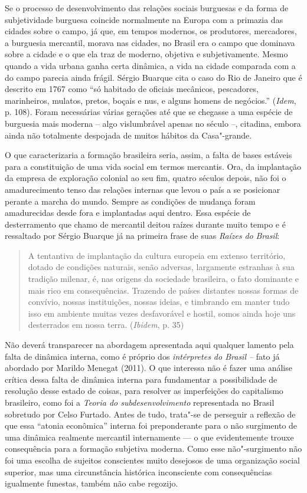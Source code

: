 {Se o processo de desenvolvimento das relações sociais burguesas e da
forma de subjetividade burguesa coincide normalmente na Europa com a
primazia das cidades sobre o campo, já que, em tempos modernos, os
produtores, mercadores, a burguesia mercantil, morava nas cidades, no
Brasil era o campo que dominava sobre a cidade e o que ela traz de
moderno, objetiva e subjetivamente. Mesmo quando a vida urbana ganha
certa dinâmica, a vida na cidade comparada com a do campo parecia ainda
frágil. Sérgio Buarque cita o caso do Rio de Janeiro que é descrito em
1767 como ``só habitado de oficiais mecânicos, pescadores, marinheiros,
mulatos, pretos, boçais e nus, e alguns homens de negócios.'' (\emph{Idem}, p. 108). Foram
necessárias várias gerações até que se chegasse a uma espécie de
burguesia mais moderna -- algo vislumbrável apenas no século  --,
citadina, embora ainda não totalmente despojada de muitos hábitos da
Casa"-grande.

O que caracterizaria a formação brasileira seria, assim, a falta de
bases estáveis para a constituição de uma vida social em termos
mercantis. Ora, da implantação da empresa de exploração colonial ao seu
fim, quatro séculos depois, não foi o amadurecimento tenso das relações
internas que levou o país a se posicionar perante a marcha do mundo.
Sempre as condições de mudança foram amadurecidas desde fora e
implantadas aqui dentro. Essa espécie de desterramento que chamo de mercantil deitou
raízes durante muito tempo e é ressaltado por Sérgio Buarque já na
primeira frase de suas \emph{Raízes} \emph{do} \emph{Brasil}:

\begin{quote}
A tentantiva de implantação da cultura europeia em extenso território,
dotado de condições naturais, senão adversas, largamente estranhas à sua
tradição milenar, é, nas origens da sociedade brasileira, o fato
dominante e mais rico em consequências. Trazendo de países distantes
nossas formas de convívio, nossas instituições, nossas ideias, e
timbrando em manter tudo isso em ambiente muitas vezes desfavorável e
hostil, somos ainda hoje uns desterrados em nossa terra. (\emph{Ibidem},
p. 35)
\end{quote}

Não deverá
transparecer na abordagem apresentada aqui qualquer lamento pela falta de dinâmica
interna, como é próprio dos \emph{intérpretes do Brasil --} fato já
abordado por Marildo Menegat (2011). O que interessa não é fazer uma
análise crítica dessa falta de dinâmica interna para fundamentar a
possibilidade de resolução desse estado de coisas, para resolver as
imperfeições do capitalismo brasileiro, como foi a \emph{Teoria do
subdesenvolvimento} representada no Brasil sobretudo por Celso Furtado.
Antes de tudo, trata"-se de perseguir a reflexão de que essa ``atonia
econômica'' interna foi preponderante para o não surgimento de uma
dinâmica realmente mercantil internamente --- o que evidentemente trouxe
consequência para a formação subjetiva moderna. Como esse não"-surgimento não
foi uma escolha de sujeitos conscientes muito desejosos de uma
organização social superior, mas uma circunstância histórica
inconsciente com consequências igualmente funestas, também não cabe
regozijo.

}
